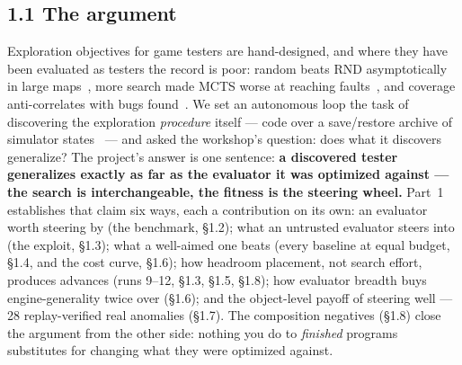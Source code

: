 
\subsection*{1.1 The argument}
Exploration objectives for game testers are hand-designed, and where they have been evaluated as testers the record is poor: random beats RND asymptotically in
large maps~\cite{goexplore-reach}, more search made MCTS worse at reaching faults~\cite{ariyurek-mcts}, and coverage anti-correlates with bugs
found~\cite{ccpt}. We set an autonomous loop the task of discovering the exploration \emph{procedure} itself --- code over a save/restore archive of simulator
states~\cite{goexplore} --- and asked the workshop's question: does what it discovers generalize? The project's answer is one sentence: \textbf{a discovered
tester generalizes exactly as far as the evaluator it was optimized against --- the search is interchangeable, the fitness is the steering wheel.} Part~1
establishes that claim six ways, each a contribution on its own: an evaluator worth steering by (the benchmark, \S1.2); what an untrusted evaluator steers into
(the exploit, \S1.3); what a well-aimed one beats (every baseline at equal budget, \S1.4, and the cost curve, \S1.6); how headroom placement, not search effort,
produces advances (runs 9--12, \S1.3, \S1.5, \S1.8); how evaluator breadth buys engine-generality twice over (\S1.6); and the object-level payoff of steering
well --- 28 replay-verified real anomalies (\S1.7). The composition negatives (\S1.8) close the argument from the other side: nothing you do to \emph{finished}
programs substitutes for changing what they were optimized against.

